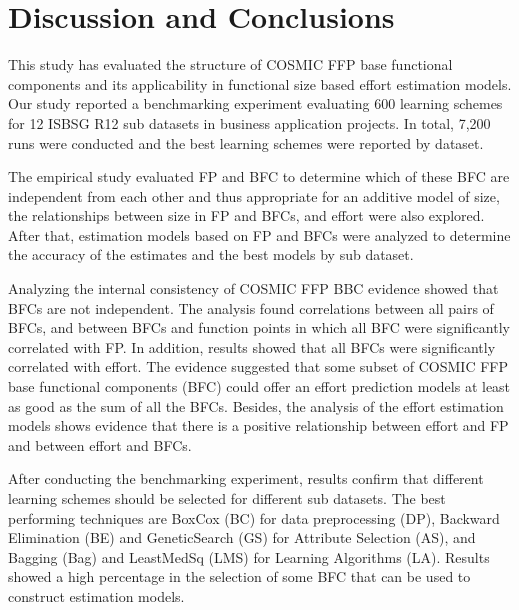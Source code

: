 \documentclass[conference]{IEEEtran}
\begin{document}

\section{Discussion and Conclusions} \label{sec:DiscussionConclusions}

This study has evaluated the structure of COSMIC FFP base functional components and its applicability in functional size based effort estimation models. Our study reported a benchmarking experiment evaluating 600 learning schemes for 12 ISBSG R12 sub datasets in business application projects. In total, 7,200 runs were conducted and the best learning schemes were reported by dataset.

The empirical study evaluated FP and BFC to determine which of these BFC are independent from each other and thus appropriate for an additive model of size, the relationships between size in FP and BFCs, and effort were also explored. After that, estimation models based on FP and BFCs were analyzed to determine the accuracy of the estimates and the best models by sub dataset.

Analyzing the internal consistency of COSMIC FFP BBC evidence showed that BFCs are not independent. The analysis found correlations between all pairs of BFCs, and between BFCs and function points in which all BFC were significantly correlated with FP. In addition, results showed that all BFCs were significantly correlated with effort. The evidence suggested that some subset of COSMIC FFP base functional components (BFC) could offer an effort prediction models at least as good as the sum of all the BFCs. Besides, the analysis of the effort estimation models shows evidence that there is a positive relationship between effort and FP and between effort and BFCs.

After conducting the benchmarking experiment, results confirm that different learning schemes should be selected for different sub datasets. The best performing techniques are BoxCox (BC) for data preprocessing (DP), Backward Elimination (BE) and GeneticSearch (GS) for Attribute Selection (AS), and Bagging (Bag) and LeastMedSq (LMS) for Learning Algorithms (LA). Results showed a high percentage in the selection of some BFC that can be used to construct estimation models.
\end{document}
